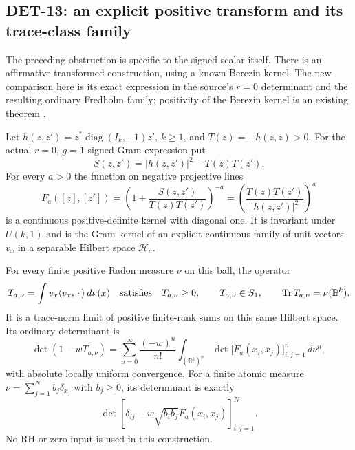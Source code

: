 \subsection{DET-13: an explicit positive transform and its trace-class family}

The preceding obstruction is specific to the signed scalar itself.  There is
an affirmative transformed construction, using a known Berezin kernel.  The
new comparison here is its exact expression in the source's $r=0$ determinant
and the resulting ordinary Fredholm family; positivity of the Berezin kernel
is an existing theorem \cite[Theorem 3.8, \S4.1 (4.1), \S4.4 (4.7)--(4.9)]{neretin}.

\begin{proposition}[DET-13]
Let $h(z,z')=z^*\operatorname{diag}(I_k,-1)z'$, $k\ge1$, and
$T(z)=-h(z,z)>0$.  For the actual $r=0$, $g=1$ signed Gram expression put
\[
 S(z,z')=|h(z,z')|^2-T(z)T(z').
\]
For every $a>0$ the function on negative projective lines
\begin{equation}
 F_a([z],[z'])=
 \left(1+\frac{S(z,z')}{T(z)T(z')}\right)^{-a}
 =\left(\frac{T(z)T(z')}{|h(z,z')|^2}\right)^a
 \label{eq:positive-gram-transform}
\end{equation}
is a continuous positive-definite kernel with diagonal one.  It is invariant
under $U(k,1)$ and is the Gram kernel of an explicit continuous family of unit
vectors $v_x$ in a separable Hilbert space $\mathcal H_a$.

For every finite positive Radon measure $\nu$ on this ball, the operator
\begin{equation}
 T_{a,\nu}=\int v_x\langle v_x,\,\cdot\,\rangle\,d\nu(x)
 \quad\hbox{satisfies}\quad
 T_{a,\nu}\ge0,\qquad T_{a,\nu}\in S_1,\qquad
 \operatorname{Tr}T_{a,\nu}=\nu(\mathbb B^k).
 \label{eq:positive-frame}
\end{equation}
It is a trace-norm limit of positive finite-rank sums on this same Hilbert
space.  Its ordinary determinant is
\begin{equation}
 \det(1-wT_{a,\nu})=
 \sum_{n=0}^{\infty}\frac{(-w)^n}{n!}
 \int_{(\mathbb B^k)^n}
 \det\big[F_a(x_i,x_j)\big]_{i,j=1}^n\,d\nu^n,
 \label{eq:positive-frame-det}
\end{equation}
with absolute locally uniform convergence.  For a finite atomic measure
$\nu=\sum_{j=1}^N b_j\delta_{x_j}$ with $b_j\ge0$, its determinant is exactly
\[
 \det\left[\delta_{ij}-w\sqrt{b_i b_j}F_a(x_i,x_j)\right]_{i,j=1}^N.
\]
No RH or zero input is used in this construction.
\end{proposition}

